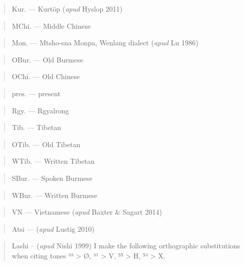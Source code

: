 \begin{quote}
Kur. --- Kurtöp (\emph{apud} Hyslop 2011)
\end{quote}

\begin{quote}
MChi. --- Middle Chinese
\end{quote}

\begin{quote}
Mon. --- Mtsho-sna Monpa, Wenlang dialect (\emph{apud} Lu 1986)
\end{quote}

\begin{quote}
OBur. --- Old Burmese
\end{quote}

\begin{quote}
OChi. --- Old Chinese
\end{quote}

\begin{quote}
pres. --- present
\end{quote}

\begin{quote}
Rgy. --- Rgyalrong
\end{quote}

\begin{quote}
Tib. --- Tibetan
\end{quote}

\begin{quote}
OTib. --- Old Tibetan
\end{quote}

\begin{quote}
WTib. --- Written Tibetan
\end{quote}

\begin{quote}
SBur. --- Spoken Burmese
\end{quote}

\begin{quote}
WBur. --- Written Burmese
\end{quote}

\begin{quote}
VN --- Vietnamese (\emph{apud} Baxter \& Sagart 2014)
\end{quote}

\begin{quote}
Atsi --- (\emph{apud} Lustig 2010)
\end{quote}

\begin{quote}
Lashi -- (\emph{apud} Nishi 1999) I make the following orthographic
substitutions when citing tones ³³ \textgreater{} Ø, ³¹ \textgreater{}
V, ⁵⁵ \textgreater{} H, ⁵³ \textgreater{} X.
\end{quote}

